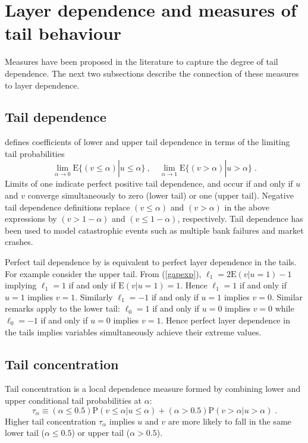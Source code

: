 \documentclass[authoryear]{elsarticle}
\newcommand{\E}{{\mathrm E}}
\newcommand{\p}{\mathrm{P}}
\newcommand{\cq}{\ ,\quad }
\newcommand{\eref}[1]{(\ref{#1})}
\begin{document}
\section{Layer dependence and measures of tail behaviour}\label{sliterature}

Measures have been proposed in the literature to capture the degree of tail dependence.   The next two subsections describe the connection of these measures to layer dependence.

\subsection{Tail dependence}

\cite{joe1997multivariate} defines coefficients of lower and upper tail dependence in terms of the limiting tail probabilities
 $$
\lim_{\alpha\rightarrow 0} \E\{(v\leq \alpha) |u\leq \alpha\} \cq
\lim_{\alpha\rightarrow 1} \E\{(v>\alpha )|u>\alpha\} \;.
$$
Limits of one indicate perfect positive tail dependence, and occur if and only if $u$ and $v$ converge simultaneously to zero (lower tail) or one (upper tail). Negative tail dependence definitions replace $(v\leq \alpha)$ and $(v>\alpha)$ in the above expressions by $(v>1-\alpha)$ and $(v\leq 1-\alpha)$, respectively.  Tail dependence has been used to model  catastrophic events such as  multiple bank failures and  market crashes.

Perfect tail dependence by \cite{joe1997multivariate} is equivalent to perfect layer dependence in the tails.  For example consider the upper tail. From \eref{gapexp}, $\ell_1=2\E(v|u=1)-1$ implying $\ell_1=1$ if and only if $\E(v|u=1)=1$.  Hence $\ell_1=1$ if and only if $u=1$ implies $v=1$.   Similarly $\ell_1=-1$ if and only if $u=1$ implies $v=0$. Similar remarks apply to the lower tail:   $\ell_0=1$ if and only if $u=0$ implies $v=0$ while $\ell_0=-1$ if and only if $u=0$ implies $v=1$. Hence perfect layer dependence in the tails implies variables simultaneously achieve their extreme values.


\subsection{Tail concentration}

Tail concentration \citep{venter2002tails} is a local dependence measure formed by combining lower and upper conditional tail probabilities at $\alpha$:
$$
\tau_\alpha \equiv (\alpha\leq 0.5) \p(v\leq \alpha|u\leq \alpha) + (\alpha>0.5)\p(v>\alpha|u>\alpha) \;.
$$
Higher tail concentration $\tau_\alpha$ implies $u$ and $v$ are more likely to fall in the same lower tail ($\alpha\leq 0.5$) or upper tail ($\alpha>0.5$).
\end{document}
